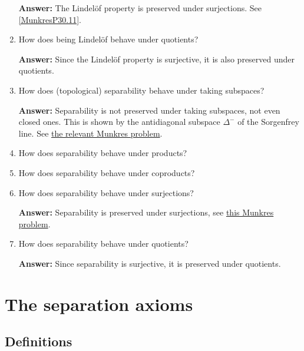 \begin{enumerate}
    \textbf{Answer: } The Lindel\"of property is preserved under surjections. See \ref{MunkresP30.11}.
    \item How does being Lindel\"of behave under quotients?

    \textbf{Answer:} Since the Lindel\"of property is surjective, it is also preserved under quotients.
    \item How does (topological) separability behave under taking subspaces?
    
    \textbf{Answer:} Separability is not preserved under taking subspaces, not even closed ones. This is shown by the antidiagonal subspace \( \Delta^- \) of the Sorgenfrey line. See \hyperlink{MunkresP30.9}{the relevant Munkres problem}.
    \item How does separability behave under products?
    \item How does separability behave under coproducts?
    \item How does separability behave under surjections?

    \textbf{Answer:} Separability is preserved under surjections, see \hyperlink{MunkresP30.11}{this Munkres problem}.
    \item How does separability behave under quotients?
    
    \textbf{Answer:} Since separability is surjective, it is preserved under quotients.
\end{enumerate}

\section{The separation axioms}

\subsection{Definitions}



